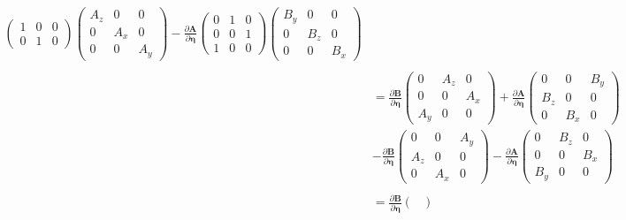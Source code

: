 \documentclass[a4paper]{article}
\begin{document}
\begin{answer}[Punto 23]
\begin{align*}
\begin{pmatrix}
            1 & 0 & 0\\
            0 & 1 & 0
        \end{pmatrix} \begin{pmatrix}
            A_z& 0 & 0\\
            0 & A_x & 0\\
            0 & 0 & A_y
        \end{pmatrix} -  \frac{\partial \mathbf A}{\partial \pmb \eta}\begin{pmatrix}
            0 & 1 & 0\\
            0 & 0 & 1\\
            1 & 0 & 0
        \end{pmatrix}  \begin{pmatrix}
            B_y & 0 & 0\\
            0 & B_z & 0\\
            0 & 0 & B_x
        \end{pmatrix}\\\\
        & = \frac{\partial \mathbf B}{\partial \pmb \eta} \begin{pmatrix}
            0 & A_z & 0\\
            0 & 0 & A_x\\
            A_y& 0 & 0
        \end{pmatrix}    +  \frac{\partial \mathbf A}{\partial \pmb \eta}\begin{pmatrix}
            0 & 0 & B_y\\
            B_z & 0 & 0\\
            0 & B_x & 0
        \end{pmatrix}\\
        &- \frac{\partial \mathbf B}{\partial \pmb \eta}\begin{pmatrix}
            0 & 0 & A_y\\
            A_z & 0 & 0\\
            0 & A_x & 0
        \end{pmatrix} -  \frac{\partial \mathbf A}{\partial \pmb \eta}\begin{pmatrix}
            0 & B_z & 0\\
            0 & 0 & B_x\\
            B_y & 0 & 0
        \end{pmatrix}\\\\
        & = \frac{\partial \mathbf B}{\partial \pmb \eta} \begin{pmatrix}

\end{pmatrix}
\end{align*}
\end{answer}
\end{document}
